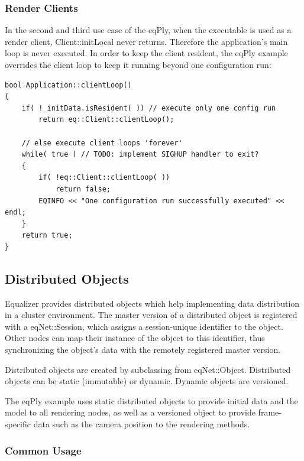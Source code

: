 \documentclass[10pt,a4]{scrartcl}
\begin{document}
\subsubsection{Render Clients}

In the second and third use case of the \textsf{eqPly}, when the
executable is used as a render client, \textsf{Client::initLocal} never
returns. Therefore the application's main loop is never executed. In
order to keep the client resident, the \textsf{eqPly} example overrides
the client loop to keep it running beyond one configuration run:

{\footnotesize\begin{lstlisting}
bool Application::clientLoop()
{
    if( !_initData.isResident( )) // execute only one config run
        return eq::Client::clientLoop();

    // else execute client loops 'forever'
    while( true ) // TODO: implement SIGHUP handler to exit?
    {
        if( !eq::Client::clientLoop( ))
            return false;
        EQINFO << "One configuration run successfully executed" << endl;
    }
    return true;
}
\end{lstlisting}}%


\subsection{Distributed Objects}

Equalizer provides distributed objects which help implementing data
distribution in a cluster environment. The master version of a distributed
object is registered with a \textsf{eqNet::Session}, which assigns a
session-unique identifier to the object. Other nodes can map their
instance of the object to this identifier, thus synchronizing the
object's data with the remotely registered master version.

Distributed objects are created by subclassing from
\textsf{eqNet::Object}. Distributed objects can be static (immutable) or
dynamic. Dynamic objects are versioned.

The \textsf{eqPly} example uses static distributed objects to provide
initial data and the model to all rendering nodes, as well as a
versioned object to provide frame-specific data such as the camera
position to the rendering methods.

\subsubsection{Common Usage}
\end{document}
